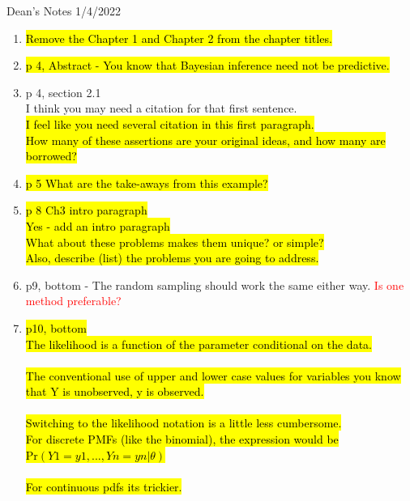 \documentclass[12pt, a4paper]{article}
\begin{document}
{\huge Dean's Notes 1/4/2022}
\begin{enumerate}
  \item \hl{Remove the Chapter 1 and Chapter 2 from the chapter titles.}
  \item \hl{p 4, Abstract - You know that Bayesian inference need not be predictive.}
  \item p 4, section 2.1 \\
    I think you may need a citation for that first  sentence.\\
    \hl{I feel like you need several citation in this first paragraph.}\\
    \hl{How many of these assertions are your original ideas, and how many are borrowed?}\\

  \item \hl{p 5  What are the take-aways from this example?}
  \item \hl{p 8 Ch3  intro paragraph}\\
    \hl{Yes - add an intro paragraph}\\
    \hl{What about these problems makes them unique? or simple?}\\
    \hl{Also, describe (list) the problems you are going to address.}\\
  \item p9, bottom - The random sampling should work the same either way.  \textcolor{red}{Is one method preferable?}
  \item \hl{p10, bottom} \\
    \hl{The likelihood is a function of the parameter conditional on the data.}\\\\

    \hl{The conventional use of upper and lower case values for variables you know that Y is unobserved, y is observed.}\\\\

    \hl{Switching to the likelihood notation is a little less cumbersome.}  \\
    \hl{For discrete PMFs (like the binomial), the expression would be}\\
    \hl{Pr$(Y1 = y1,...,Yn=yn | \theta)$}\\\\

    \hl{For continuous pdfs its trickier.}


\end{enumerate}
\end{document}
